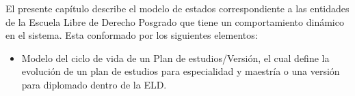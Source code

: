 
El presente capítulo describe el modelo de estados correspondiente a las entidades de la Escuela Libre de Derecho Posgrado que tiene un comportamiento dinámico en el sistema. Esta conformado por los siguientes elementos:
\begin{itemize}
	\item Modelo del ciclo de vida de un Plan de estudios/Versión, el cual define la evolución de un plan de estudios para especialidad y maestría o una versión para diplomado dentro de la ELD.
\end{itemize}


